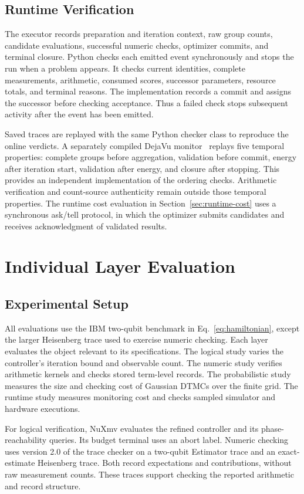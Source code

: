 \documentclass[conference]{IEEEtran}
\begin{document}
\subsection{Runtime Verification}
\label{sec:runtime}
The executor records preparation and iteration context, raw group counts, candidate evaluations, successful numeric checks, optimizer commits, and terminal closure. Python checks each emitted event synchronously and stops the run when a problem appears. It checks current identities, complete measurements, arithmetic, consumed scores, successor parameters, resource totals, and terminal reasons. The implementation records a commit and assigns the successor before checking acceptance. Thus a failed check stops subsequent activity after the event has been emitted.

Saved traces are replayed with the same Python checker class to reproduce the online verdicts. A separately compiled DejaVu monitor~\cite{dejavu} replays five temporal properties: complete groups before aggregation, validation before commit, energy after iteration start, validation after energy, and closure after stopping. This provides an independent implementation of the ordering checks. Arithmetic verification and count-source authenticity remain outside those temporal properties. The runtime cost evaluation in Section~\ref{sec:runtime-cost} uses a synchronous ask/tell protocol, in which the optimizer submits candidates and receives acknowledgment of validated results.

\section{Individual Layer Evaluation}
\label{sec:individual}
\subsection{Experimental Setup}
All evaluations use the IBM two-qubit benchmark in Eq.~\eqref{eq:hamiltonian}, except the larger Heisenberg trace used to exercise numeric checking. Each layer evaluates the object relevant to its specifications. The logical study varies the controller's iteration bound and observable count. The numeric study verifies arithmetic kernels and checks stored term-level records. The probabilistic study measures the size and checking cost of Gaussian DTMCs over the finite grid. The runtime study measures monitoring cost and checks sampled simulator and hardware executions.

For logical verification, NuXmv evaluates the refined controller and its phase-reachability queries. Its budget terminal uses an abort label. Numeric checking uses version 2.0 of the trace checker on a two-qubit Estimator trace and an exact-estimate Heisenberg trace. Both record expectations and contributions, without raw measurement counts. These traces support checking the reported arithmetic and record structure.
\end{document}

